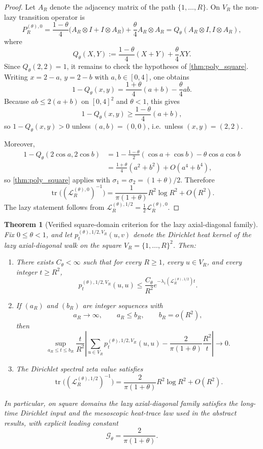 \documentclass[reqno]{amsart}
\numberwithin{equation}{section}
\newtheorem{theorem}{Theorem}[section]
\theoremstyle{definition}
\theoremstyle{remark}
\newcommand{\Cref}[1]{\autoref{#1}}
\newcommand{\cG}{\mathcal{G}}
\DeclareMathOperator{\tr}{tr}
\begin{document}
\begin{proof}
Let $A_R$ denote the adjacency matrix of the path $\{1,\dots,R\}$. On $V_R$ the non-lazy transition operator is
\[
  P_R^{(\theta),0}
  =
  \frac{1-\theta}{4}\bigl(A_R\otimes I+I\otimes A_R\bigr)
  +
  \frac{\theta}{4}A_R\otimes A_R
  =
  Q_\theta(A_R\otimes I,I\otimes A_R),
\]
where
\[
  Q_\theta(X,Y):=\frac{1-\theta}{4}(X+Y)+\frac{\theta}{4}XY.
\]
Since $Q_\theta(2,2)=1$, it remains to check the hypotheses of \Cref{thm:poly_square}. Writing $x=2-a$, $y=2-b$ with $a,b\in[0,4]$, one obtains
\[
  1-Q_\theta(x,y)
  =
  \frac{1+\theta}{4}(a+b)-\frac{\theta}{4}ab.
\]
Because $ab\le 2(a+b)$ on $[0,4]^2$ and $\theta<1$, this gives
\[
  1-Q_\theta(x,y)\ge \frac{1-\theta}{4}(a+b),
\]
so $1-Q_\theta(x,y)>0$ unless $(a,b)=(0,0)$, i.e.\ unless $(x,y)=(2,2)$.

Moreover,
\begin{align*}
  1-Q_\theta(2\cos a,2\cos b)
  &=
  1-\frac{1-\theta}{2}(\cos a+\cos b)-\theta\cos a\cos b \\
  &=
  \frac{1+\theta}{4}(a^2+b^2)+O(a^4+b^4),
\end{align*}
so \Cref{thm:poly_square} applies with $\sigma_1=\sigma_2=(1+\theta)/2$. Therefore
\[
  \tr\!\bigl((\mathcal L_R^{(\theta),0})^{-1}\bigr)
  =
  \frac{1}{\pi(1+\theta)}R^2\log R^2+O(R^2).
\]
The lazy statement follows from $\mathcal L_R^{(\theta),1/2}=\frac12\mathcal L_R^{(\theta),0}$.
\end{proof}

\begin{theorem}[Verified square-domain criterion for the lazy axial-diagonal family]\label{thm:axial_diagonal_verified}
Fix $0\le \theta<1$, and let $p_t^{(\theta),1/2,V_R}(u,v)$ denote the Dirichlet heat kernel of the lazy axial-diagonal walk on the square $V_R=\{1,\dots,R\}^2$. Then:
\begin{enumerate}
  \item There exists $C_\theta<\infty$ such that for every $R\ge1$, every $u\in V_R$, and every integer $t\ge R^2$,
  \[
    p_t^{(\theta),1/2,V_R}(u,u)
    \le
    \frac{C_\theta}{R^2}e^{-\lambda_1(\mathcal L_R^{(\theta),1/2})t}.
  \]
  \item If $(a_R)$ and $(b_R)$ are integer sequences with
  \[
    a_R\to\infty,
    \qquad
    a_R\le b_R,
    \qquad
    b_R=o(R^2),
  \]
  then
  \[
    \sup_{a_R\le t\le b_R}
    \frac{t}{R^2}
    \left|
      \sum_{u\in V_R} p_t^{(\theta),1/2,V_R}(u,u)
      -
      \frac{2}{\pi(1+\theta)}\frac{R^2}{t}
    \right|
    \longrightarrow 0.
  \]
  \item The Dirichlet spectral zeta value satisfies
  \[
    \tr\!\bigl((\mathcal L_R^{(\theta),1/2})^{-1}\bigr)
    =
    \frac{2}{\pi(1+\theta)}R^2\log R^2+O(R^2).
  \]
\end{enumerate}
In particular, on square domains the lazy axial-diagonal family satisfies the long-time Dirichlet input and the mesoscopic heat-trace law used in the abstract results, with explicit leading constant
\[
  \cG_\theta=\frac{2}{\pi(1+\theta)}.
\]
\end{theorem}
\end{document}
